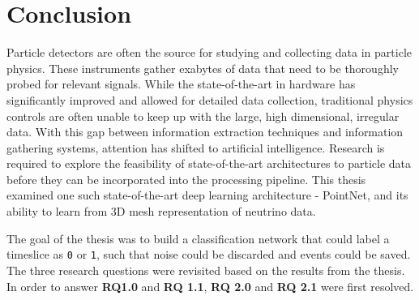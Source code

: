 \chapter{Conclusion}
\label{sec:conclusion}

\ifpdf
    \graphicspath{{10_conclusion/figures/PNG/}{10_conclusion/figures/PDF/}{10_conclusion/figures/}}
\else
    \graphicspath{{10_conclusion/figures/EPS/}{10_conclusion/figures/}}
\fi

Particle detectors are often the source for studying and collecting data in particle physics. These instruments gather exabytes of data that need to be thoroughly probed for relevant signals. While the state-of-the-art in hardware has significantly improved and allowed for detailed data collection, traditional physics controls are often unable to keep up with the large, high dimensional, irregular data. With this gap between information extraction techniques and information gathering systems, attention has shifted to artificial intelligence. Research is required to explore the feasibility of state-of-the-art architectures to particle data before they can be incorporated into the processing pipeline. This thesis examined one such state-of-the-art deep learning architecture - PointNet, and its ability to learn from 3D mesh representation of neutrino data.

The goal of the thesis was to build a classification network that could label a timeslice as \texttt{0} or \texttt{1}, such that noise could be discarded and events could be saved. The three research questions were revisited based on the results from the thesis. In order to answer \textbf{RQ1.0} and \textbf{RQ 1.1}, \textbf{RQ 2.0} and \textbf{RQ 2.1} were first resolved. 

